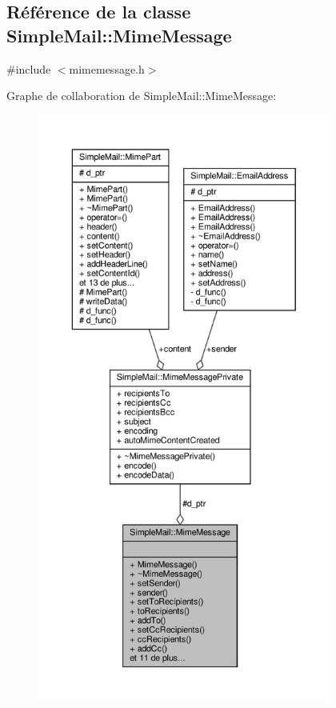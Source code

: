 \hypertarget{class_simple_mail_1_1_mime_message}{}\subsection{Référence de la classe Simple\+Mail\+:\+:Mime\+Message}
\label{class_simple_mail_1_1_mime_message}


{\ttfamily \#include $<$mimemessage.\+h$>$}



Graphe de collaboration de Simple\+Mail\+:\+:Mime\+Message\+:\nopagebreak
\begin{figure}[H]
\begin{center}
\leavevmode
\includegraphics[height=550pt]{class_simple_mail_1_1_mime_message__coll__graph}
\end{center}
\end{figure}
